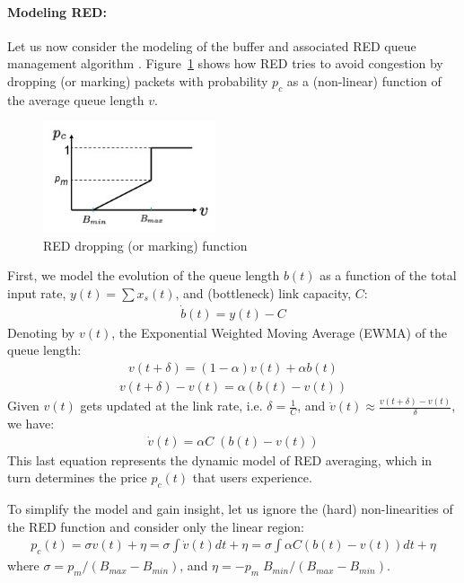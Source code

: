\documentclass{article}
\begin{document}
\paragraph{Modeling RED:}
Let us now consider the modeling of the buffer and associated RED queue management algorithm \cite{red:1993}.
Figure~\ref{fig:red} shows how RED tries to avoid congestion by dropping (or marking) packets with probability $p_c$ 
as a (non-linear) function of the average queue length $v$.
\begin{figure}[htbp]
   \centering
   \includegraphics[width=2in]{figures/red.jpg} %
   \caption{RED dropping (or marking) function}
   \label{fig:red}
\end{figure}
First, we model the evolution of the queue length $b(t)$ as 
a function of the total input rate, $y(t) = \sum x_s(t)$, and (bottleneck) link capacity, $C$:
\begin{eqnarray*}
\dot{b}(t) =  y(t) - C
\end{eqnarray*}
Denoting by $v(t)$, the Exponential Weighted Moving Average (EWMA) of the queue length:
\begin{eqnarray*}
v(t+\delta) = (1 - \alpha) v(t) + \alpha b(t)
\end{eqnarray*}
\begin{eqnarray*}
v(t+\delta) - v(t) = \alpha (b(t) - v(t))
\end{eqnarray*}
Given $v(t)$ gets updated at the link rate, i.e. $\delta = \frac{1}{C}$,
and $\dot{v}(t) \approx \frac{v(t+\delta) - v(t)}{\delta}$, we have:
\begin{eqnarray*}
\dot{v}(t) = \alpha C \; (b(t) - v(t))
\end{eqnarray*}
This last equation represents the dynamic model of RED averaging, which in turn determines the price $p_c(t)$ that users experience. 

To simplify the model and gain insight, let us ignore the (hard) non-linearities of the RED function
and consider only the linear region:
\begin{eqnarray*}
p_c(t) = \sigma v(t) + \eta = \sigma \int \dot{v}(t) dt + \eta = \sigma \int \alpha C(b(t) - v(t)) dt + \eta
\end{eqnarray*}
where $\sigma = p_m/(B_{max}-B_{min})$, and $\eta= -p_m\;B_{min}/(B_{max}-B_{min})$.
\end{document}
